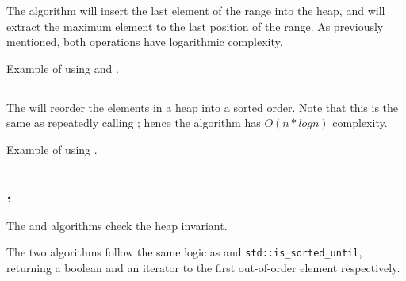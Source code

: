 The  algorithm will insert the last element of the range into the heap, and  will extract the maximum element to the last position of the range. As previously mentioned, both operations have logarithmic complexity.

\begin{codebox}[breakable]{\href{https://compiler-explorer.com/z/h34Eh5T7a}{\ExternalLink}}
\footnotesize Example of using  and .
\tcblower
{}
\end{codebox}

\subsection{\texorpdfstring{}{\texttt{std::sort\_heap}}}

The  will reorder the elements in a heap into a sorted order. Note that this is the same as repeatedly calling ; hence the algorithm has $O(n*logn)$ complexity.


\begin{codebox}[]{\href{https://compiler-explorer.com/z/odrjGK7xb}{\ExternalLink}}
\footnotesize Example of using .
\tcblower
{}
\end{codebox}

\subsection{\texorpdfstring{, }{\texttt{std::is\_heap}, \texttt{std::is\_heap\_until}}}

The  and  algorithms check the heap invariant.



The two algorithms follow the same logic as  and \texttt{std::is\-\_sorted\-\_until}, returning a boolean and an iterator to the first out-of-order element respectively.

